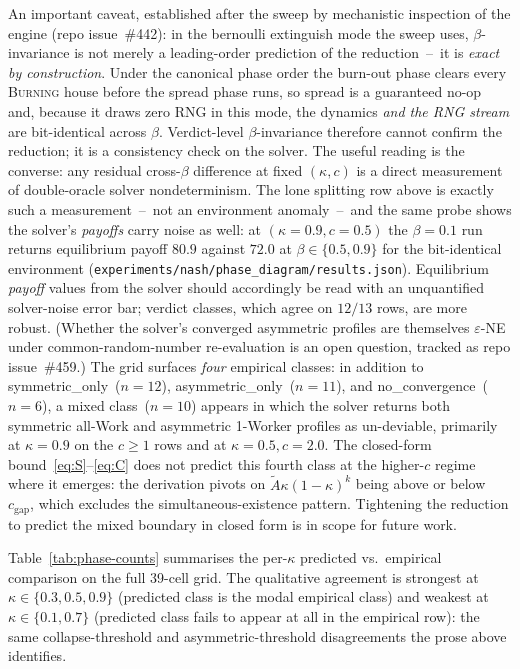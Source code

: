 \documentclass{anvil-paper}
\begin{document}
An important caveat, established after the sweep by mechanistic
inspection of the engine (repo issue~\#442): in the bernoulli extinguish
mode the sweep uses, $\beta$-invariance is not merely a leading-order
prediction of the reduction~--~it is \emph{exact by construction}. Under
the canonical phase order the burn-out phase clears every
\textsc{Burning} house before the spread phase runs, so spread is a
guaranteed no-op and, because it draws zero RNG in this mode, the
dynamics \emph{and the RNG stream} are bit-identical across $\beta$.
Verdict-level $\beta$-invariance therefore cannot confirm the reduction;
it is a consistency check on the solver. The useful reading is the
converse: any residual cross-$\beta$ difference at fixed $(\kappa,c)$ is
a direct measurement of double-oracle solver nondeterminism. The lone
splitting row above is exactly such a measurement~--~not an environment
anomaly~--~and the same probe shows the solver's \emph{payoffs} carry
noise as well: at $(\kappa{=}0.9,c{=}0.5)$ the $\beta{=}0.1$ run
returns equilibrium payoff $80.9$ against $72.0$ at
$\beta\in\{0.5,0.9\}$ for the bit-identical environment
(\texttt{experiments/nash/phase\_diagram/results.json}). Equilibrium
\emph{payoff} values from the solver should accordingly be read with an
unquantified solver-noise error bar; verdict classes, which agree on
$12/13$ rows, are more robust. (Whether the solver's converged
asymmetric profiles are themselves $\varepsilon$-NE under
common-random-number re-evaluation is an open question, tracked as repo
issue~\#459.) The grid surfaces \emph{four}
empirical classes: in addition to \textsf{symmetric\_only}~($n{=}12$),
\textsf{asymmetric\_only}~($n{=}11$), and \textsf{no\_convergence}~($n{=}6$),
a \textsf{mixed} class~($n{=}10$) appears in which the solver returns both
symmetric all-Work and asymmetric 1-Worker profiles as un-deviable,
primarily at $\kappa{=}0.9$ on the $c{\geq}1$ rows and at $\kappa{=}0.5,
c{=}2.0$. The closed-form bound~\eqref{eq:S}--\eqref{eq:C} does not predict
this fourth class at the higher-$c$ regime where it emerges: the derivation
pivots on $\tilde A\kappa(1-\kappa)^{k}$ being above or below
$c_{\text{gap}}$, which excludes the simultaneous-existence pattern.
Tightening the reduction to predict the \textsf{mixed} boundary in closed
form is in scope for future work.

Table~\ref{tab:phase-counts} summarises the per-$\kappa$ predicted
vs.\ empirical comparison on the full 39-cell grid. The qualitative
agreement is strongest at $\kappa\in\{0.3, 0.5, 0.9\}$ (predicted
class is the modal empirical class) and weakest at $\kappa\in\{0.1, 0.7\}$
(predicted class fails to appear at all in the empirical row): the same
collapse-threshold and asymmetric-threshold disagreements the prose
above identifies.
\end{document}
